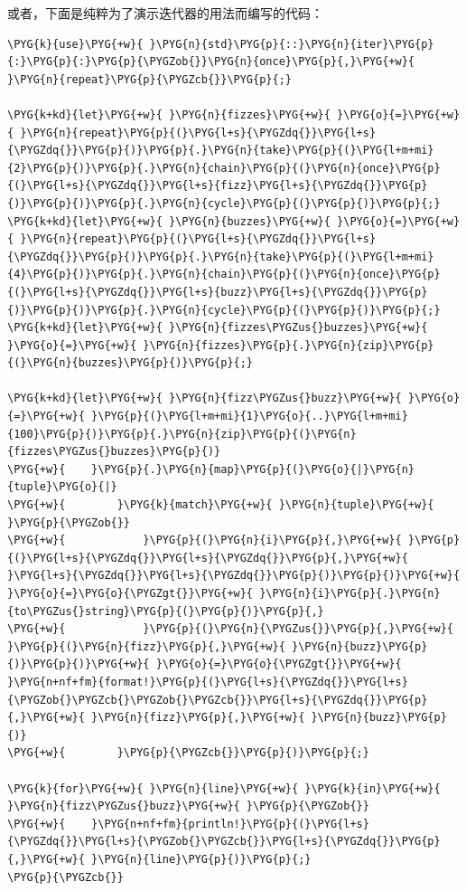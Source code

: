 或者，下面是纯粹为了演示迭代器的用法而编写的代码：

\begin{Verbatim}[commandchars=\\\{\},breaklines=true,breakanywhere=true,fontsize=\codefont,xleftmargin=17bp]
\PYG{k}{use}\PYG{+w}{ }\PYG{n}{std}\PYG{p}{::}\PYG{n}{iter}\PYG{p}{:}\PYG{p}{:}\PYG{p}{\PYGZob{}}\PYG{n}{once}\PYG{p}{,}\PYG{+w}{ }\PYG{n}{repeat}\PYG{p}{\PYGZcb{}}\PYG{p}{;}

\PYG{k+kd}{let}\PYG{+w}{ }\PYG{n}{fizzes}\PYG{+w}{ }\PYG{o}{=}\PYG{+w}{ }\PYG{n}{repeat}\PYG{p}{(}\PYG{l+s}{\PYGZdq{}}\PYG{l+s}{\PYGZdq{}}\PYG{p}{)}\PYG{p}{.}\PYG{n}{take}\PYG{p}{(}\PYG{l+m+mi}{2}\PYG{p}{)}\PYG{p}{.}\PYG{n}{chain}\PYG{p}{(}\PYG{n}{once}\PYG{p}{(}\PYG{l+s}{\PYGZdq{}}\PYG{l+s}{fizz}\PYG{l+s}{\PYGZdq{}}\PYG{p}{)}\PYG{p}{)}\PYG{p}{.}\PYG{n}{cycle}\PYG{p}{(}\PYG{p}{)}\PYG{p}{;}
\PYG{k+kd}{let}\PYG{+w}{ }\PYG{n}{buzzes}\PYG{+w}{ }\PYG{o}{=}\PYG{+w}{ }\PYG{n}{repeat}\PYG{p}{(}\PYG{l+s}{\PYGZdq{}}\PYG{l+s}{\PYGZdq{}}\PYG{p}{)}\PYG{p}{.}\PYG{n}{take}\PYG{p}{(}\PYG{l+m+mi}{4}\PYG{p}{)}\PYG{p}{.}\PYG{n}{chain}\PYG{p}{(}\PYG{n}{once}\PYG{p}{(}\PYG{l+s}{\PYGZdq{}}\PYG{l+s}{buzz}\PYG{l+s}{\PYGZdq{}}\PYG{p}{)}\PYG{p}{)}\PYG{p}{.}\PYG{n}{cycle}\PYG{p}{(}\PYG{p}{)}\PYG{p}{;}
\PYG{k+kd}{let}\PYG{+w}{ }\PYG{n}{fizzes\PYGZus{}buzzes}\PYG{+w}{ }\PYG{o}{=}\PYG{+w}{ }\PYG{n}{fizzes}\PYG{p}{.}\PYG{n}{zip}\PYG{p}{(}\PYG{n}{buzzes}\PYG{p}{)}\PYG{p}{;}

\PYG{k+kd}{let}\PYG{+w}{ }\PYG{n}{fizz\PYGZus{}buzz}\PYG{+w}{ }\PYG{o}{=}\PYG{+w}{ }\PYG{p}{(}\PYG{l+m+mi}{1}\PYG{o}{..}\PYG{l+m+mi}{100}\PYG{p}{)}\PYG{p}{.}\PYG{n}{zip}\PYG{p}{(}\PYG{n}{fizzes\PYGZus{}buzzes}\PYG{p}{)}
\PYG{+w}{    }\PYG{p}{.}\PYG{n}{map}\PYG{p}{(}\PYG{o}{|}\PYG{n}{tuple}\PYG{o}{|}
\PYG{+w}{        }\PYG{k}{match}\PYG{+w}{ }\PYG{n}{tuple}\PYG{+w}{ }\PYG{p}{\PYGZob{}}
\PYG{+w}{            }\PYG{p}{(}\PYG{n}{i}\PYG{p}{,}\PYG{+w}{ }\PYG{p}{(}\PYG{l+s}{\PYGZdq{}}\PYG{l+s}{\PYGZdq{}}\PYG{p}{,}\PYG{+w}{ }\PYG{l+s}{\PYGZdq{}}\PYG{l+s}{\PYGZdq{}}\PYG{p}{)}\PYG{p}{)}\PYG{+w}{ }\PYG{o}{=}\PYG{o}{\PYGZgt{}}\PYG{+w}{ }\PYG{n}{i}\PYG{p}{.}\PYG{n}{to\PYGZus{}string}\PYG{p}{(}\PYG{p}{)}\PYG{p}{,}
\PYG{+w}{            }\PYG{p}{(}\PYG{n}{\PYGZus{}}\PYG{p}{,}\PYG{+w}{ }\PYG{p}{(}\PYG{n}{fizz}\PYG{p}{,}\PYG{+w}{ }\PYG{n}{buzz}\PYG{p}{)}\PYG{p}{)}\PYG{+w}{ }\PYG{o}{=}\PYG{o}{\PYGZgt{}}\PYG{+w}{ }\PYG{n+nf+fm}{format!}\PYG{p}{(}\PYG{l+s}{\PYGZdq{}}\PYG{l+s}{\PYGZob{}\PYGZcb{}\PYGZob{}\PYGZcb{}}\PYG{l+s}{\PYGZdq{}}\PYG{p}{,}\PYG{+w}{ }\PYG{n}{fizz}\PYG{p}{,}\PYG{+w}{ }\PYG{n}{buzz}\PYG{p}{)}
\PYG{+w}{        }\PYG{p}{\PYGZcb{}}\PYG{p}{)}\PYG{p}{;}

\PYG{k}{for}\PYG{+w}{ }\PYG{n}{line}\PYG{+w}{ }\PYG{k}{in}\PYG{+w}{ }\PYG{n}{fizz\PYGZus{}buzz}\PYG{+w}{ }\PYG{p}{\PYGZob{}}
\PYG{+w}{    }\PYG{n+nf+fm}{println!}\PYG{p}{(}\PYG{l+s}{\PYGZdq{}}\PYG{l+s}{\PYGZob{}\PYGZcb{}}\PYG{l+s}{\PYGZdq{}}\PYG{p}{,}\PYG{+w}{ }\PYG{n}{line}\PYG{p}{)}\PYG{p}{;}
\PYG{p}{\PYGZcb{}}
\end{Verbatim}

